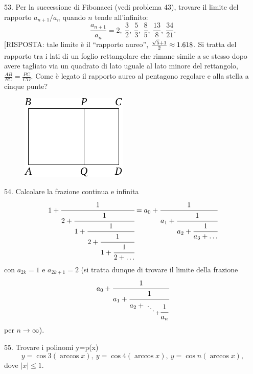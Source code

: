 \begin{problem}{53.}
	Per la successione di Fibonacci (vedi problema 43), trovare il limite del rapporto  
	$a_{n+1}/a_n$ quando $n$ tende all’infinito:\vspace{2\jot}
	\begin{equation*}
		\frac{a_{n+1}}{a_n}=2,\ \frac 32,\ \frac53, \ \frac85, \ \frac{13}8,
		\ \frac{34}{21}.
	\end{equation*}
	[RISPOSTA: tale limite è il \enquote{rapporto aureo},
	$\frac{\sqrt{5}+1}{2\vphantom)} \approx 1.618$. Si tratta del rapporto tra i lati di un foglio rettangolare che rimane simile a se stesso dopo avere tagliato via un quadrato di lato uguale al lato minore del rettangolo,
	$\frac{AB}{BC}=\frac{PC}{CD}$. Come è legato il rapporto aureo al pentagono regolare e alla stella a cinque punte? 
	\begin{figure}
		\includegraphics{resources/taskbook-37}
	\end{figure}
\end{problem}

\begin{problem}{54.}
Calcolare la frazione continua e infinita
	\begin{equation*}
		1+\cfrac{1}{2+\cfrac{1}{1+\cfrac{1}{2+\cfrac{1}{1+\cfrac{1}{2+\ldots}}}}}=
		a_0+\cfrac{1}{a_1+\cfrac{1}{a_2+\cfrac{1}{a_3+\dots}}}
	\end{equation*}
	con $a_{2k}=1$ e $a_{2k+1}=2$ (si tratta dunque di trovare il limite della frazione
	\begin{equation*}
		a_0+\cfrac{1}{a_1+\cfrac{1}{a_2+{\atop{\ddots \atop {}} + \cfrac{1}{a_n}}}}
	\end{equation*}
	per $n \to \infty$).
\end{problem}

\begin{problem}{55.}
	Trovare i polinomi y=p(x)
	\begin{equation*}
		y=\cos 3 (\arccos x),\ y=\cos 4 (\arccos x),\ 
		y=\cos n (\arccos x),
	\end{equation*}
	dove $|x| \leqslant 1$.
\end{problem}

